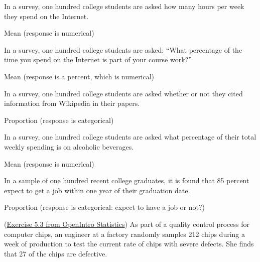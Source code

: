\documentclass[12pt]{exam}
\begin{document}
\begin{questions}
  \begin{parts}
  \item
    In a survey, one hundred college students are asked how many hours
    per week they spend on the Internet.
\begin{solution}
Mean (response is numerical)
\end{solution}
\vfill
  \item
    In a survey, one hundred college students are asked: ``What
    percentage of the time you spend on the Internet is part of your
    course work?''
\begin{solution}
Mean (response is a percent, which is numerical)
\end{solution}
\vfill
  \item
    In a survey, one hundred college students are asked whether or not
    they cited information from Wikipedia in their papers.
\begin{solution}
Proportion (response is categorical)
\end{solution}
\vfill
  \item
    In a survey, one hundred college students are asked what percentage
    of their total weekly spending is on alcoholic beverages.
\begin{solution}
Mean (response is numerical)
\end{solution}
\vfill
  \item
    In a sample of one hundred recent college graduates, it is found
    that 85 percent expect to get a job within one year of their
    graduation date.
\begin{solution}
Proportion (response is categorical: expect to have a job or not?)
\end{solution}
\vfill
  \end{parts}
\newpage
\item
  (\href{http://people.hsc.edu/faculty-staff/blins/books/OpenIntroStats4e.pdf\#eoce.5.3}{Exercise 5.3 from OpenIntro Statistics}) As part of a quality control process for computer chips, an engineer
  at a factory randomly samples 212 chips during a week of production to
  test the current rate of chips with severe defects. She finds that 27
  of the chips are defective.


\end{questions}
\end{document}
